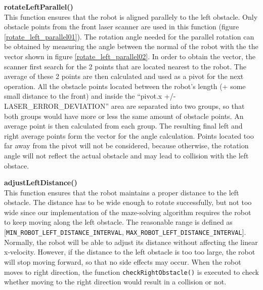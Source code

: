 \begin{description}
\item \textbf{rotateLeftParallel()} \label{item:rotateLeftParallel} \hfill \\
This function ensures that the robot is aligned parallely to the left obstacle. Only obstacle points from the front laser scanner are used in this function (figure \ref{rotate_left_parallel01}). The rotation angle needed for the parallel rotation can be obtained by measuring the angle between the normal of the robot with the the vector shown in figure \ref{rotate_left_parallel02}. In order to obtain the vector, the scanner first search for the 2 points that are located nearest to the robot. The average of these 2 points are then calculated and used as a pivot for the next operation. All the obstacle points located between the robot's length (+ some small distance to the front) and inside the ``pivot.x +/- LASER\_ERROR\_DEVIATION'' area are separated into two groups, so that both groups would have more or less the same amount of obstacle points. An average point is then calculated from each group. The resulting final left and right average points form the vector for the angle calculation. Points located too far away from the pivot will not be considered, because otherwise, the rotation angle will not reflect the actual obstacle and may lead to collision with the left obstace.

\item \textbf{adjustLeftDistance()} \label{item:adjustLeftDistance} \hfill \\
This function ensures that the robot maintains a proper distance to the left obstacle. The distance has to be wide enough to rotate successfully, but not too wide since our implementation of the maze-solving algorithm requires the robot to keep moving along the left obstacle. The reasonable range is defined as [\texttt{MIN\_ROBOT\_LEFT\_DISTANCE\_INTERVAL}, \texttt{MAX\_ROBOT\_LEFT\_DISTANCE\_INTERVAL}]. Normally, the robot will be able to adjust its distance without affecting the linear x-velocity. However, if the distance to the left obstacle is too too large, the robot will stop moving forward, so that no side effects may occur. When the robot moves to right direction, the function \texttt{checkRightObstacle()} is executed to check whether moving to the right direction would result in a collision or not. 


\end{description}
